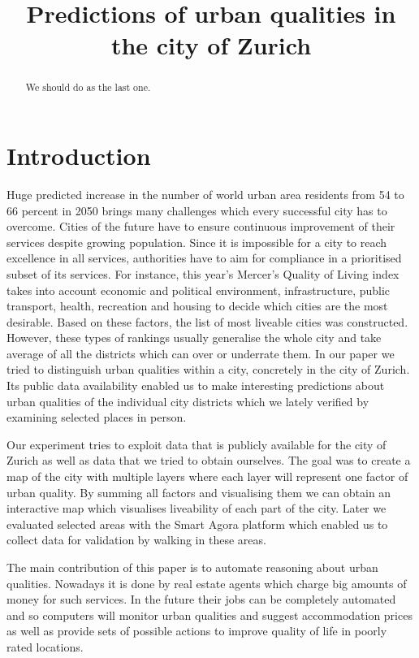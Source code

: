 \documentclass[letterpaper]{article}
\title{Predictions of urban qualities in the city of Zurich}
\begin{document}
%
\maketitle
%

\begin{abstract}
We should do as the last one.
\end{abstract}

\section{Introduction}\label{sec:intro}
Huge predicted increase in the number of world urban area residents from 54 to 66 percent in 2050 brings many challenges
which every successful city has to overcome. Cities of the future have to ensure continuous improvement of their
services despite growing population. Since it is impossible for a city to reach excellence in all services,
authorities have to aim for compliance in a prioritised subset of its services. For instance, this year's Mercer's Quality of Living index\cite{mercer}
takes into account economic and political environment, infrastructure, public transport, health, recreation and housing
to decide which cities are the most desirable. Based on these factors, the list of most liveable cities was constructed.
However, these types of rankings usually generalise the whole city and take average of all the districts which can
over or underrate them. In our paper we tried to distinguish urban qualities within a city, concretely in the city of Zurich.
Its public data availability enabled us to make interesting predictions about urban qualities of the individual city districts
which we lately verified by examining selected places in person.

\indent Our experiment tries to exploit data that is publicly available for the city of Zurich as well as data that we tried to obtain ourselves.
The goal was to create a map of the city with multiple layers where each layer will represent one factor of urban quality. By summing all factors and
visualising them we can obtain an interactive map which visualises liveability of each part of the city. Later we evaluated selected areas with the Smart
Agora platform which enabled us to collect data for validation by walking in these areas.

\indent The main contribution of this paper is to automate reasoning about urban qualities. Nowadays it is done by
real estate agents which charge big amounts of money for such services. In the future their jobs can be
completely automated and so computers will monitor urban qualities and suggest accommodation prices as well as
provide sets of possible actions to improve quality of life in poorly rated locations.
\end{document}
